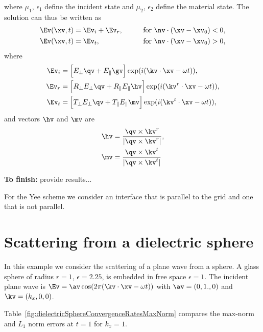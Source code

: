 \documentclass[11pt]{article}
\begin{document}
where $\mu_1$, $\epsilon_1$ define the incident state and $\mu_2$, $\epsilon_2$ define the material state.
The solution can thus be written as
\begin{alignat}{3}
   \Ev(\xv,t) &= \Ev_i  + \Ev_r , \qquad&&\text{for $\nv\cdot(\xv-\xv_0) < 0$} , \\
   \Ev(\xv,t) &= \Ev_t          , \qquad&&\text{for $\nv\cdot(\xv-\xv_0) > 0$} , 
\end{alignat}
where
\begin{align}
   \Ev_i &= \Big[ E_\perp \qv + E_\parallel \gv \Big] \exp(i(\kv\cdot\xv - \omega t)), \\
   \Ev_r &= \Big[ R_\perp E_\perp \qv + R_\parallel E_\parallel \hv \Big] \exp(i(\kv^r\cdot\xv - \omega t)), \\
   \Ev_t &= \Big[ T_\perp E_\perp \qv + T_\parallel E_\parallel \mv \Big] \exp(i(\kv^t\cdot\xv - \omega t)), 
\end{align}
and vectors $\hv$ and $\mv$ are 
\begin{align}
  \hv &= \frac{\qv \times \kv^r}{\vert \qv \times \kv^r \vert},\\
  \mv &= \frac{\qv \times \kv^t}{\vert \qv \times \kv^t \vert} 
\end{align}



{\bf To finish: } provide results...

For the Yee scheme we consider an interface that is parallel to the grid and one that is not parallel. 



\clearpage
\section{Scattering from a dielectric sphere}\label{sec:dielectricSphere}

In this example we consider the scattering of a plane wave from a
sphere.
A glass sphere of radius $r=1$, $\epsilon=2.25$, is embedded in free space $\epsilon=1$. 
The incident plane wave is $\Ev = \av \cos(2\pi(\kv\cdot\xv - \omega t) )$ with
$\av=( 0, 1., 0)$ and $\kv=(k_x,0,0)$.

Table~\ref{fig:dielectricSphereConvergenceRatesMaxNorm} compares the max-norm and $L_1$ norm errors
at $t=1$ for $k_x=1$. 
\end{document}
